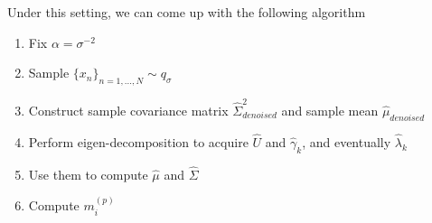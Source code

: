 \hfill \break
Under this setting, we can come up with the following algorithm
\begin{enumerate}
    \item Fix $\alpha=\sigma^{-2}$
    \item Sample $\{x_n\}_{n=1,...,N}\sim q_\sigma$
    \item Construct sample covariance matrix $\hat{\Sigma}^2_{denoised}$ and sample mean $\hat{\mu}_{denoised}$
    \item Perform eigen-decomposition to acquire $\hat{U}$ and $\hat{\gamma}_k$, and eventually $\hat{\lambda}_k$
    \item Use them to compute $\hat{\mu}$ and $\hat{\Sigma}$
    \item Compute $m_i^{(p)}$
\end{enumerate}